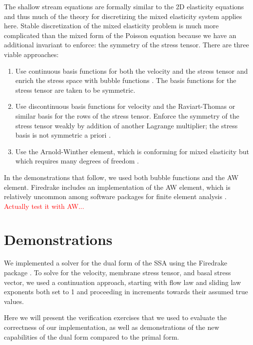 \documentclass{article}
\theoremstyle{definition}
\theoremstyle{plain}
\begin{document}
The shallow stream equations are formally similar to the 2D elasticity equations and thus much of the theory for discretizing the mixed elasticity system applies here.
Stable discretization of the mixed elasticity problem is much more complicated than the mixed form of the Poisson equation because we have an additional invariant to enforce: the symmetry of the stress tensor.
There are three viable approaches:
\begin{enumerate}
    \item Use continuous basis functions for both the velocity and the stress tensor and enrich the stress space with bubble functions \citep{brezzi1993mixed}.
        The basis functions for the stress tensor are taken to be symmetric.
    \item Use discontinuous basis functions for velocity and the Raviart-Thomas or similar basis for the rows of the stress tensor.
        Enforce the symmetry of the stress tensor weakly by addition of another Lagrange multiplier; the stress basis is not symmetric a priori \citep{arnold1984peers}.
    \item Use the Arnold-Winther element, which is conforming for mixed elasticity but which requires many degrees of freedom \citep{arnold2002mixed}.
\end{enumerate}
In the demonstrations that follow, we used both bubble functions and the AW element.
Firedrake includes an implementation of the AW element, which is relatively uncommon among software packages for finite element analysis \citep{aznaran2021transformations}.
\textcolor{red}{Actually test it with AW...}


\section{Demonstrations}

We implemented a solver for the dual form of the SSA using the Firedrake package \citep{FiredrakeUserManual}.
To solve for the velocity, membrane stress tensor, and basal stress vector, we used a continuation approach, starting with flow law and sliding law exponents both set to 1 and proceeding in increments towards their assumed true values.

Here we will present the verification exercises that we used to evaluate the correctness of our implementation, as well as demonstrations of the new capabilities of the dual form compared to the primal form.
\end{document}
